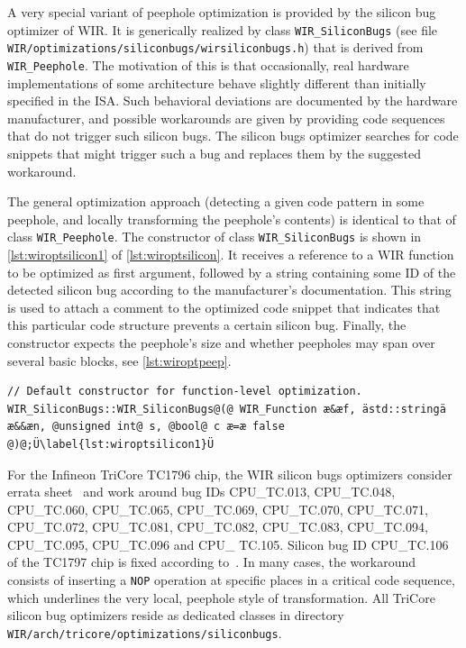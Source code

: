 A very special variant of peephole optimization is provided by the silicon bug optimizer of \gls{WIR}.
It is generically realized by class \texttt{WIR\_SiliconBugs} (see file \texttt{WIR/optimizations/siliconbugs/wirsiliconbugs.h}) that is derived from \texttt{WIR\_Peephole}.
The motivation of this is that occasionally, real hardware implementations of some architecture behave slightly different than initially specified in the \gls{ISA}.
Such behavioral deviations are documented by the hardware manufacturer, and possible workarounds are given by providing code sequences that do not trigger such silicon bugs.
The silicon bugs optimizer searches for code snippets that might trigger such a bug and replaces them by the suggested workaround.

The general optimization approach (detecting a given code pattern in some peephole, and locally transforming the peephole's contents) is identical to that of class \texttt{WIR\_Peephole}.
The constructor of class \texttt{WIR\_SiliconBugs} is shown in \cref{lst:wiroptsilicon1} of \cref{lst:wiroptsilicon}.
It receives a reference to a \gls{WIR} function to be optimized as first argument, followed by a string containing some ID of the detected silicon bug according to the manufacturer's documentation.
This string is used to attach a comment to the optimized code snippet that indicates that this particular code structure prevents a certain silicon bug.
Finally, the constructor expects the peephole's size and whether peepholes may span over several basic blocks, see \cref{lst:wiroptpeep}.

\begin{lstlisting}[style=code,float=!t,caption={Constructor of Class \texttt{WIR\_SiliconBugs}},label=lst:wiroptsilicon]
// Default constructor for function-level optimization.
WIR_SiliconBugs::WIR_SiliconBugs@(@ WIR_Function æ&æf, ästd::stringä æ&&æn, @unsigned int@ s, @bool@ c æ=æ false @)@;Ü\label{lst:wiroptsilicon1}Ü
\end{lstlisting}

For the Infineon TriCore TC1796 chip, the \gls{WIR} silicon bugs optimizers consider errata sheet~\cite{tc179608} and work around bug IDs CPU\_TC.013, CPU\_TC.048, CPU\_TC.060, CPU\_TC.065, CPU\_TC.069, CPU\_TC.070, CPU\_TC.071, CPU\_TC.072, CPU\_TC.081, CPU\_TC.082, CPU\_TC.083, CPU\_TC.094, CPU\_TC.095, CPU\_TC.096 and CPU\_ TC.105.
Silicon bug ID CPU\_TC.106 of the TC1797 chip is fixed according to~\cite{tc179709}.
In many cases, the workaround consists of inserting a \texttt{NOP} operation at specific places in a critical code sequence, which underlines the very local, peephole style of transformation.
All TriCore silicon bug optimizers reside as dedicated classes in directory \texttt{WIR/arch/tricore/optimizations/siliconbugs}.


